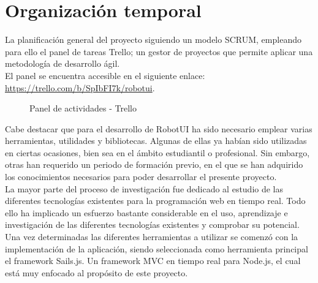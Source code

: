 \chapter{Organización temporal}
\label{chap:planificación}

La planificación general del proyecto siguiendo un modelo SCRUM, empleando para ello el panel de tareas Trello; un gestor de proyectos que permite aplicar una metodología de desarrollo ágil.\\

El panel se encuentra accesible en el siguiente enlace: \url{https://trello.com/b/SpIbFI7k/robotui}.

\begin{figure}[H]
\caption{Panel de actividades - Trello}
\end{figure}


Cabe destacar que para el desarrollo de RobotUI ha sido necesario emplear varias herramientas, utilidades y bibliotecas. Algunas de ellas ya habían sido utilizadas en ciertas ocasiones, bien sea en el ámbito estudiantil o profesional. 
Sin embargo, otras han requerido un periodo de formación previo, en el que se han adquirido los conocimientos necesarios para poder desarrollar el presente proyecto.\\

La mayor parte del proceso de investigación fue dedicado al estudio de las diferentes tecnologías existentes para la programación web en tiempo real. Todo ello ha implicado un esfuerzo bastante considerable en el uso, 
aprendizaje e investigación de las diferentes tecnologías existentes y comprobar su potencial.\\

Una vez determinadas las diferentes herramientas a utilizar se comenzó con la implementación de la aplicación, siendo seleccionada como herramienta principal el framework Sails.js. Un framework MVC en 
tiempo real para Node.js, el cual está muy enfocado al propósito de este proyecto.\\


